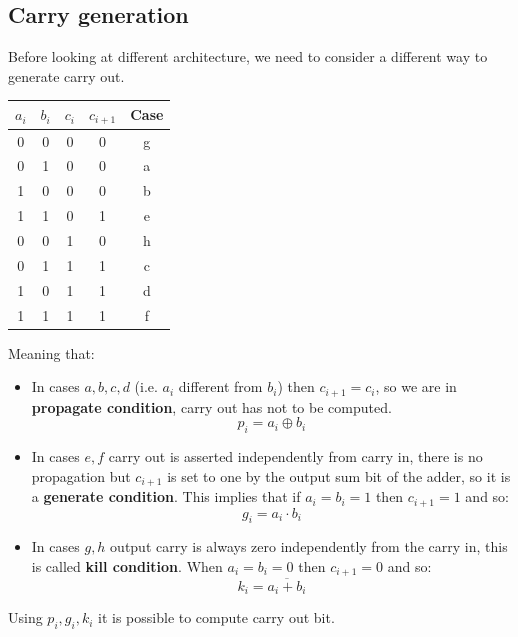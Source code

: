 \subsection{Carry generation}
Before looking at different architecture, we need to consider a different way
to generate carry out.

\begin{center}
  \begin{tabular}{|c|c|c|c|c|}
    \hline
     $a_i$& $b_i$&    $c_i$&    $c_{i+1}$& Case\\
     \hline
      0&    0&    0&    0&    g\\
      0&    1&    0&    0&    a\\
      1&    0&    0&    0&    b\\
      1&    1&    0&    1&    e\\
      0&    0&    1&    0&    h\\
      0&    1&    1&    1&    c\\
      1&    0&    1&    1&    d\\
      1&    1&    1&    1&    f\\
    \hline
  \end{tabular}
\end{center}

Meaning that:

\begin{itemize}
  \item  In cases $a,b,c,d$ (i.e. $a_i$ different from $b_i$) then
    $c_{i+1}= c_i$, so we are in \textbf{propagate condition},
    carry out has not to be computed.
  $$p_i=a_i \oplus b_i$$

  \item In cases $e,f$ carry out is asserted independently from carry in,
    there is no propagation but $c_{i+1}$ is set to one by the output sum bit
    of the adder, so it is a \textbf{generate condition}. This implies that
    if $a_i=b_i=1$ then $c_{i+1}=1$ and so:
  $$g_i=a_i \cdot b_i$$

  \item In cases $g, h$ output carry is always zero independently from the 
    carry in, this is called \textbf{kill condition}. When $a_i=b_i=0$ 
    then $c_{i+1}=0$ and so:
  $$k_i=\overline{a_i+b_i}$$

\end{itemize}

Using $p_i, g_i, k_i$ it is possible to compute carry out bit.


